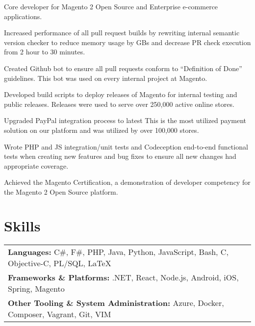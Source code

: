\documentclass[line]{resume}
\begin{document}
\vspace{2px}
\begin{myitemize}
	\item Core developer for Magento 2 Open Source and Enterprise e-commerce applications.
	\item Increased performance of all pull request builds by rewriting internal semantic version checker to reduce memory usage by GBs and decrease PR check execution from 2 hour to 30 minutes.
	\item Created Github bot to ensure all pull requests conform to ``Definition of Done'' guidelines. This bot was used on every internal project at Magento.
	\item Developed build scripts to deploy releases of Magento for internal testing and public releases. Releases were used to serve over 250,000 active online stores.
	\item Upgraded PayPal integration process to latest  This is the most utilized payment solution on our platform and was utilized by over 100,000 stores. 
	\item Wrote PHP and JS integration/unit tests and Codeception end-to-end functional tests when creating new features and bug fixes to ensure all new changes had appropriate coverage.
	\item Achieved the Magento Certification, a demonstration of developer competency for the Magento 2 Open Source platform.
\end{myitemize}

\vspace{2px}

\vspace{2px}

\vspace{-2px}
\section{Skills}
\vspace{-1px}
\begin{tabularx}{\linewidth}{X}
	\textbf{Languages:} C\#, F\#, PHP, Java, Python, JavaScript, Bash, C, Objective-C, PL/SQL, \LaTeX \\
	\textbf{Frameworks \& Platforms:} .NET, React, Node.js, Android, iOS, Spring, Magento \\
	\textbf{Other Tooling \& System Administration:} Azure, Docker, Composer, Vagrant, Git, VIM \\
\end{tabularx}
\end{document}
